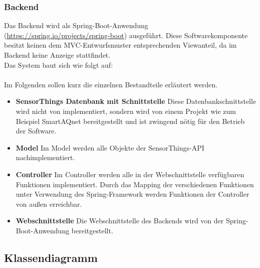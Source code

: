 \subsubsection{Backend}
Das Backend wird als Spring-Boot-Anwendung (\url{https://spring.io/projects/spring-boot}) ausgeführt.
Diese Softwarekomponente besitzt keinen dem MVC-Entwurfsmuster entsprechenden Viewanteil, da im Backend keine Anzeige stattfindet.
\\
Das System baut sich wie folgt auf:
\\

\\
Im Folgenden sollen kurz die einzelnen Bestandteile erläutert werden.
\begin{itemize}
    \item \textbf{SensorThings Datenbank mit Schnittstelle} Diese Datenbankschnittstelle wird nicht von \softwarename implementiert, sondern wird von einem Projekt wie zum Beispiel SmartAQnet bereitgestellt und ist zwingend nötig für den Betrieb der Software.
    \item \textbf{Model} Im Model werden alle Objekte der SensorThings-API nachimplementiert.
    \item \textbf{Controller} Im Controller werden alle in der Webschnittstelle verfügbaren Funktionen implementiert.
    Durch das Mapping der verschiedenen Funktionen unter Verwendung des Spring-Framework werden Funktionen der Controller von außen erreichbar.
    \item \textbf{Webschnittstelle} Die Webschnittstelle des Backends wird von der Spring-Boot-Anwendung bereitgestellt.
\end{itemize}

\subsection{Klassendiagramm}

